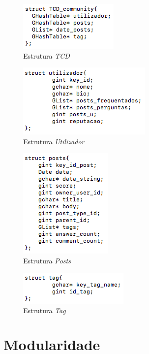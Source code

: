 \documentclass[a4paper]{article}
\begin{document}
\begin{figure}[H]
\centering
\includegraphics[scale=0.70]{image_tcd}
\caption{Estrutura \textit{TCD}}
\label{img:tcd}
\end{figure}

\begin{figure}[H]
\centering
\includegraphics[scale=0.70]{image_utilizador}
\caption{Estrutura \textit{Utilizador}}
\label{img:utilizador}
\end{figure}

\begin{figure}[H]
\centering
\includegraphics[scale=0.70]{image_posts}
\caption{Estrutura \textit{Posts}}
\label{img:posts}
\end{figure}

\begin{figure}[H]
\centering
\includegraphics[scale=0.70]{image_tag}
\caption{Estrutura \textit{Tag}}
\label{img:tag}
\end{figure}

\newpage

\section{Modularidade}
\label{sec:modularidade}
\end{document}

